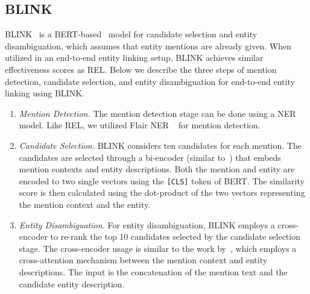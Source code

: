 \subsection{BLINK}
BLINK~\citep{blink} is a BERT-based~\citep{BERT} model for candidate selection and entity disambiguation, which assumes that entity mentions are already given. When utilized in an end-to-end entity linking setup, BLINK achieves similar effectiveness scores as REL. Below we describe the three steps of mention detection, candidate selection, and entity disambiguation for end-to-end entity linking using BLINK.

\begin{enumerate}
    \item \emph{Mention Detection.} The mention detection stage can be done using a NER model. Like REL, we utilized Flair NER ~\citep{flair} for mention detection.
	\item \emph{Candidate Selection.} BLINK considers ten candidates for each mention. The candidates are selected through a bi-encoder (similar to~\citet{poly-encoders}) that embeds mention contexts and entity descriptions. Both the mention and entity are encoded to two single vectors using the \texttt{[CLS]} token of BERT. The similarity score is then calculated using the dot-product of the two vectors representing the mention context and the entity.  
	\item \emph{Entity Disambiguation.} For entity disambiguation, BLINK employs a cross-encoder to re-rank the top 10 candidates selected by the candidate selection stage. The cross-encoder usage is similar to the work by~\citet{poly-encoders}, which employs a cross-attention mechanism between the mention context and entity descriptions. The input is the concatenation of the mention text and the candidate entity description.    
\end{enumerate}

